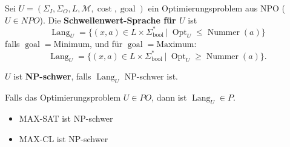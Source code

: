 \begin{definition}
Sei \(U = (\Sigma_I, \Sigma_O, L, \mathcal{M}, \operatorname{cost}, \operatorname{goal})\) ein Optimierungsproblem aus NPO (\(U \in NPO\)). Die \textbf{Schwellenwert-Sprache für \(U\)} ist
\[
  \operatorname{Lang}_U = \{ (x, a) \in L \times \Sigma_\text{bool}^* \ |\ \operatorname{Opt}_U \leq \operatorname{Nummer}(a) \}
\]
falls \(\operatorname{goal} = \text{Minimum}\), und für \(\operatorname{goal} = \text{Maximum}\):
\[
\operatorname{Lang}_U = \{ (x, a) \in L \times \Sigma_\text{bool}^* \ |\ \operatorname{Opt}_U \geq \operatorname{Nummer}(a) \}.
\]

\(U\) ist \textbf{NP-schwer}, falls \(\operatorname{Lang}_U\) NP-schwer ist.\\
\end{definition}

\begin{lemma}
Falls das Optimierungsproblem \(U \in PO\), dann ist \(\operatorname{Lang}_U \in P\).\\
\end{lemma}


\begin{lemma}
\begin{itemize}
  \item MAX-SAT ist NP-schwer
  \item MAX-CL ist NP-schwer
\end{itemize}
\end{lemma}
